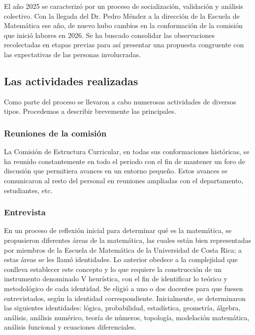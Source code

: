 El año 2025 se caracterizó por un proceso de socialización, validación y análisis colectivo. Con la llegada del Dr. Pedro Méndez a la dirección de la Escuela de Matemática ese año, de nuevo hubo cambios en la conformación de la comisión que inició labores en 2026. Se ha buscado consolidar las observaciones recolectadas en etapas previas para así presentar una propuesta congruente con las expectativas de las personas involucradas.

\subsection{Las actividades realizadas}

Como parte del proceso se llevaron a cabo numerosas actividades de diversos tipos. Procedemos a describir brevemente las principales.

\subsubsection{Reuniones de la comisión}

La Comisión de Estructura Curricular, en todas sus conformaciones históricas, se ha reunido constantemente en todo el periodo con el fin de mantener un foro de discusión que permitiera avances en un entorno pequeño. Estos avances se comunicaron al resto del personal en reuniones ampliadas con el departamento, estudiantes, etc.



\subsubsection{Entrevista}

En un proceso de reflexión inicial para determinar qué es la matemática, se propusieron diferentes áreas de la matemática, las cuales están bien representadas por miembros de la Escuela de Matemática de la Universidad de Costa Rica; a estas áreas se les llamó identidades. Lo anterior obedece a la complejidad que conlleva establecer este concepto y lo que requiere la construcción de un instrumento denominado V heurística, con el fin de identificar lo teórico y metodológico de cada identidad. Se eligió a uno o dos docentes para que fuesen entrevistados, según la identidad correspondiente. Inicialmente, se determinaron las siguientes identidades: lógica, probabilidad, estadística, geometría, álgebra, análisis, análisis numérico, teoría de números, topología, modelación matemática, análisis funcional y ecuaciones diferenciales.

